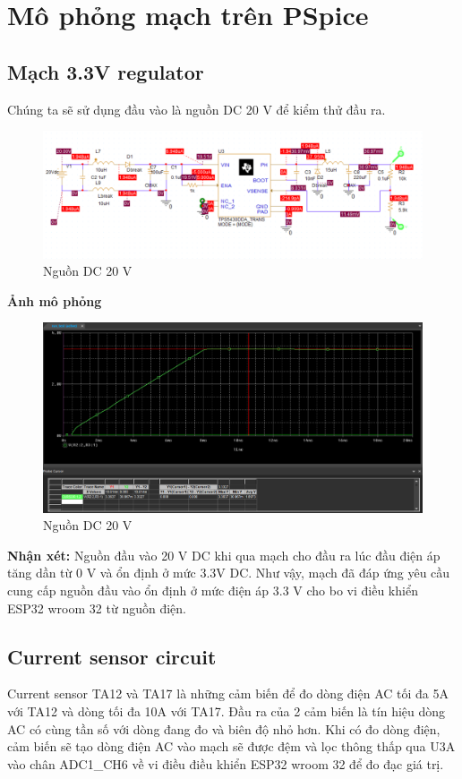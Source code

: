 \section{Mô phỏng mạch trên PSpice}
\subsection{Mạch 3.3V regulator}
Chúng ta sẽ sử dụng đầu vào là nguồn DC 20 V để kiểm thử đầu ra.

\begin{figure}[ht]
    \centering
    \includegraphics[width=1\textwidth]{graphics/section4/f1.png}
    \caption{Nguồn DC 20 V}
\end{figure}

\textbf{Ảnh mô phỏng}
\begin{figure}[ht]
    \centering
    \includegraphics[width=1\textwidth]{graphics/section4/f2.png}
    \caption{Nguồn DC 20 V}
\end{figure}

\textbf{Nhận xét: }Nguồn đầu vào 20 V DC khi qua mạch cho đầu ra lúc đầu điện áp tăng dần từ 0 V và ổn định ở mức 3.3V DC. Như vậy, mạch đã đáp ứng yêu cầu cung cấp nguồn đầu vào ổn định ở mức điện áp 3.3 V cho bo vi điều khiển ESP32 wroom 32 từ nguồn điện.  

\pagebreak
\subsection{Current sensor circuit}
Current sensor TA12 và TA17 là những cảm biến để đo dòng điện AC tối đa 5A với TA12 và dòng tối đa 10A với TA17. Đầu ra của 2 cảm biến là tín hiệu dòng AC có cùng tần số với dòng đang đo và biên độ nhỏ hơn. Khi có đo dòng điện, cảm biến sẽ tạo dòng điện AC vào mạch sẽ được đệm và lọc thông thấp qua U3A vào chân ADC1\_CH6 về vi điều điều khiển ESP32 wroom 32 để đo đạc giá trị.

